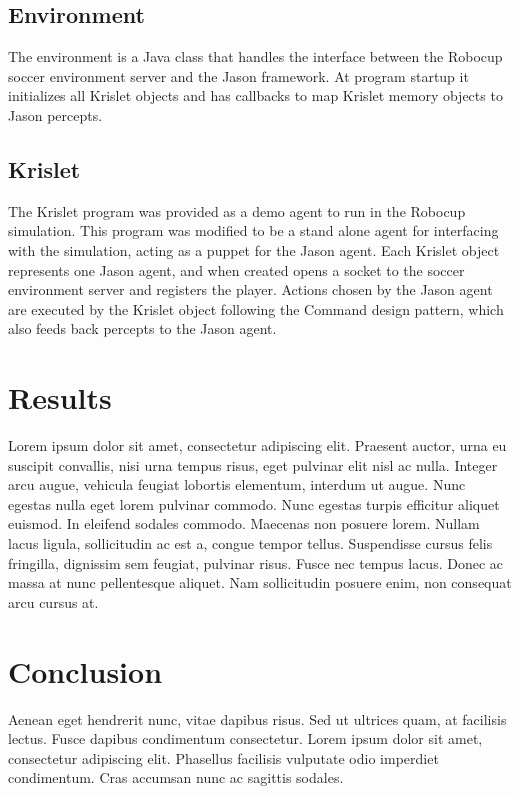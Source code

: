 \documentclass[conference]{IEEEtran}
\begin{document}
\subsection{Environment}
The environment is a Java class that handles the interface between the Robocup soccer environment server and the Jason framework. At program startup it initializes all Krislet objects and has callbacks to map Krislet memory objects to Jason percepts. 

\subsection{Krislet}
The Krislet program was provided as a demo agent to run in the Robocup simulation. This program was modified to be a stand alone agent for interfacing with the simulation, acting as a puppet for the Jason agent. Each Krislet object represents one Jason agent, and when created opens a socket to the soccer environment server and registers the player. Actions chosen by the Jason agent are executed by the Krislet object following the Command design pattern, which also feeds back percepts to the Jason agent.


\section{Results}
Lorem ipsum dolor sit amet, consectetur adipiscing elit. Praesent auctor, urna eu suscipit convallis, nisi urna tempus risus, eget pulvinar elit nisl ac nulla. Integer arcu augue, vehicula feugiat lobortis elementum, interdum ut augue. Nunc egestas nulla eget lorem pulvinar commodo. Nunc egestas turpis efficitur aliquet euismod. In eleifend sodales commodo. Maecenas non posuere lorem. Nullam lacus ligula, sollicitudin ac est a, congue tempor tellus. Suspendisse cursus felis fringilla, dignissim sem feugiat, pulvinar risus. Fusce nec tempus lacus. Donec ac massa at nunc pellentesque aliquet. Nam sollicitudin posuere enim, non consequat arcu cursus at. 
\section{Conclusion}
Aenean eget hendrerit nunc, vitae dapibus risus. Sed ut ultrices quam, at facilisis lectus. Fusce dapibus condimentum consectetur. Lorem ipsum dolor sit amet, consectetur adipiscing elit. Phasellus facilisis vulputate odio imperdiet condimentum. Cras accumsan nunc ac sagittis sodales. 
\end{document}
